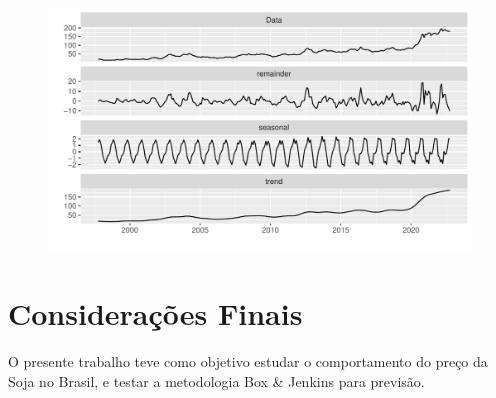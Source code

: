 \documentclass[
	12pt,				%
	openright,			%
	oneside,      %
	a4paper,			%
	english,			%
	french,				%
	spanish,			%
	brazil,				%
	]{abntex2}\usepackage[]{graphicx}\usepackage[]{xcolor}
\makeatletter
\def\maxwidth{ %
  \ifdim\Gin@nat@width>\linewidth
    \linewidth
  \else
    \Gin@nat@width
  \fi
}
\newenvironment{knitrout}{}{} %
\makeatother
\begin{document}
\begin{knitrout}
\color{fgcolor}\begin{figure}
\includegraphics[width=\maxwidth]{figure/script2-1} \end{figure}

\end{knitrout}




















\chapter{Considerações Finais}

O presente trabalho teve como objetivo estudar o comportamento do preço da Soja no Brasil, e testar a metodologia Box \& Jenkins para previsão.





%
%


\end{document}
